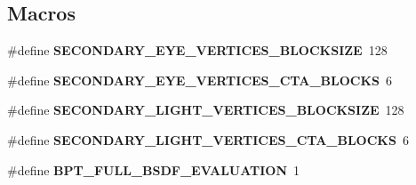 \subsection*{Macros}
\begin{DoxyCompactItemize}
\item 
\mbox{\label{group___b_p_t_lib_ga71f970985c5da77d78f06f6e7d5d8197}} 
\#define {\bfseries S\+E\+C\+O\+N\+D\+A\+R\+Y\+\_\+\+E\+Y\+E\+\_\+\+V\+E\+R\+T\+I\+C\+E\+S\+\_\+\+B\+L\+O\+C\+K\+S\+I\+ZE}~128
\item 
\mbox{\label{group___b_p_t_lib_gaaa91d7549a1af1ea8509dce2f22f47ba}} 
\#define {\bfseries S\+E\+C\+O\+N\+D\+A\+R\+Y\+\_\+\+E\+Y\+E\+\_\+\+V\+E\+R\+T\+I\+C\+E\+S\+\_\+\+C\+T\+A\+\_\+\+B\+L\+O\+C\+KS}~6
\item 
\mbox{\label{group___b_p_t_lib_gaa759d91a72dc1a035e5a6bfaeafb9631}} 
\#define {\bfseries S\+E\+C\+O\+N\+D\+A\+R\+Y\+\_\+\+L\+I\+G\+H\+T\+\_\+\+V\+E\+R\+T\+I\+C\+E\+S\+\_\+\+B\+L\+O\+C\+K\+S\+I\+ZE}~128
\item 
\mbox{\label{group___b_p_t_lib_ga6571352dc82cb32b2f3e713f1da021a4}} 
\#define {\bfseries S\+E\+C\+O\+N\+D\+A\+R\+Y\+\_\+\+L\+I\+G\+H\+T\+\_\+\+V\+E\+R\+T\+I\+C\+E\+S\+\_\+\+C\+T\+A\+\_\+\+B\+L\+O\+C\+KS}~6
\item 
\mbox{\label{group___b_p_t_lib_ga0a83949d77b6abc018e6b073ca561324}} 
\#define {\bfseries B\+P\+T\+\_\+\+F\+U\+L\+L\+\_\+\+B\+S\+D\+F\+\_\+\+E\+V\+A\+L\+U\+A\+T\+I\+ON}~1
\end{DoxyCompactItemize}
